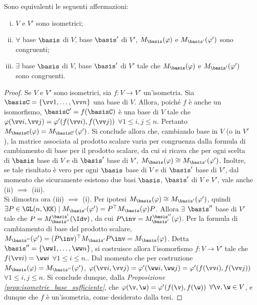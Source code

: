 \begin{proposition} Sono equivalenti le seguenti affermazioni:
		\label{prop:isometrie_equivalenza_base}
	\begin{enumerate}[(i)]
		\item $V$ e $V'$ sono isometrici;
		\item $\forall$ base $\basis$ di $V$, base $\basis'$ di $V'$,
		$M_\basis(\varphi)$ e $M_{\basis'}(\varphi')$ sono congruenti;
		\item $\exists$ base $\basis$ di $V$, base $\basis'$ di $V'$ tale che
		$M_\basis(\varphi)$ e $M_{\basis'}(\varphi')$ sono congruenti.
	\end{enumerate}
\end{proposition}

\begin{proof} Se $V$ e $V'$ sono isometrici, sia $f : V \to V'$ un'isometria. Sia $\basisC = \{ \vv 1, \ldots, \vv n \}$ una base di $V$. Allora, poiché $f$ è anche un isomorfismo, $\basisC' = f(\basisC)$ è una base di $V$ tale che
	$\varphi(\vv i, \vv j) = \varphi'(f(\vv i), f(\vv j))$ $\forall 1 \leq i, j \leq n$. Pertanto $M_\basisC(\varphi) = M_{\basisC'}(\varphi')$. Si conclude allora che, cambiando base in $V$ (o in $V'$), la matrice associata
	al prodotto scalare varia per congruenza dalla formula di cambiamento di base per il prodotto scalare, da cui si ricava che per ogni scelta di $\basis$ base di $V$ e di $\basis'$ base di $V'$, $M_\basis(\varphi) \cong M_{\basis'}(\varphi')$. Inoltre, se tale risultato è vero per ogni $\basis$ base di $V$ e di $\basis'$ base di $V'$, dal momento che sicuramente esistono due basi $\basis$, $\basis'$ di $V$ e $V'$, vale anche (ii) $\implies$ (iii). \\
	
	Si dimostra ora (iii) $\implies$ (i). Per ipotesi $M_\basis(\varphi) \cong M_{\basis'}(\varphi')$, quindi
	$\exists P \in \GL(n, \KK) \mid M_{\basis'}(\varphi') = P^\top M_\basis(\varphi) P$. Allora $\exists$ $\basis''$
	base di $V'$ tale che $P = M_{\basis''}^{\basis'}(\Idv)$, da cui $P\inv = M_{\basis'}^{\basis''}(\varphi)$. Per la formula di cambiamento di base del prodotto
	scalare, $M_{\basis''}(\varphi') = (P\inv)^\top M_{\basis'} P\inv = M_\basis(\varphi)$. Detta
	$\basis'' = \{ \ww 1, \ldots, \ww n \}$, si costruisce allora l'isomorfismo $f : V \to V'$ tale
	che $f(\vv i) = \ww i$ $\forall 1 \leq i \leq n$.. Dal momento che per costruzione $M_\basis(\varphi) = M_{\basis''}(\varphi')$,
	$\varphi(\vv i, \vv j) = \varphi'(\ww i, \ww j) = \varphi'(f(\vv i), f(\vv j))$ $\forall 1 \leq i, j \leq n$.
	Si conclude dunque, dalla \textit{Proposizione \ref{prop:isometrie_base_sufficiente}}, che $\varphi(\v, \w) = \varphi'(f(\v), f(\w))$ $\forall \v, \w \in V$, e dunque
	che $f$ è un'isometria, come desiderato dalla tesi. 
\end{proof}

